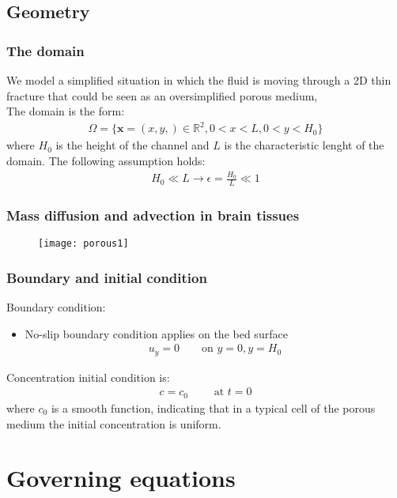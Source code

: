 \documentclass{beamer}
\begin{document}
\subsection{Geometry}
\begin{frame}
\frametitle{The domain}
We model a simplified situation in which the fluid is moving through a 2D thin fracture that could be seen as an oversimplified porous medium,\\The domain is the form:
\begin{align*}
\Omega=\{\mathbf{x}=(x,y,)\in \mathbb{R}^2,0<x<L, 0<y<H_0\}
\end{align*}
where $H_0$ is the height of the channel and $L$ is the characteristic lenght of the domain.
The following assumption holds:
\begin{align*}
H_0\ll L \to \epsilon=\frac{H_0}{L}\ll1
\end{align*}
\end{frame}
\begin{frame}
\frametitle{Mass diffusion and advection in brain tissues}
\begin{figure}
\texttt{[image: porous1]}
\end{figure}
\end{frame}


\begin{frame}
\frametitle{Boundary and initial condition}
Boundary condition:
\begin{itemize}
\item No-slip boundary condition applies on the bed surface
\begin{align*}
u_y=0 \qquad \text{on   } y=0, y=H_0 
 \end{align*}
\end{itemize}
Concentration initial condition is:
\begin{align*}
c=c_0\qquad \text{  at    }t=0
\end{align*}
where $c_0$ is a smooth function, indicating that in a typical cell of the porous medium the initial concentration is uniform.
\end{frame}

\section{Governing equations}
\end{document}
